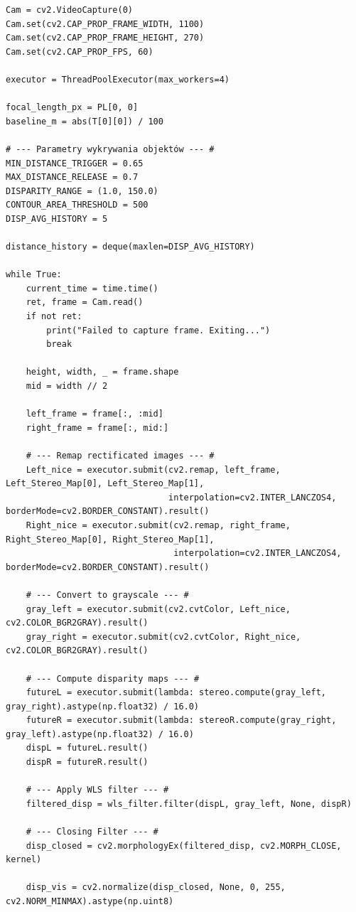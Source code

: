 \documentclass[magisterska]{pracadypl}
\begin{document}
\begin{lstlisting}[style=mypython]
Cam = cv2.VideoCapture(0)
Cam.set(cv2.CAP_PROP_FRAME_WIDTH, 1100)  
Cam.set(cv2.CAP_PROP_FRAME_HEIGHT, 270)
Cam.set(cv2.CAP_PROP_FPS, 60)

executor = ThreadPoolExecutor(max_workers=4)

focal_length_px = PL[0, 0]
baseline_m = abs(T[0][0]) / 100  

# --- Parametry wykrywania objektów --- #
MIN_DISTANCE_TRIGGER = 0.65
MAX_DISTANCE_RELEASE = 0.7
DISPARITY_RANGE = (1.0, 150.0)
CONTOUR_AREA_THRESHOLD = 500
DISP_AVG_HISTORY = 5

distance_history = deque(maxlen=DISP_AVG_HISTORY)

while True:
    current_time = time.time()
    ret, frame = Cam.read()
    if not ret:
        print("Failed to capture frame. Exiting...")
        break

    height, width, _ = frame.shape
    mid = width // 2

    left_frame = frame[:, :mid]
    right_frame = frame[:, mid:]

    # --- Remap rectificated images --- #
    Left_nice = executor.submit(cv2.remap, left_frame, Left_Stereo_Map[0], Left_Stereo_Map[1],
                                interpolation=cv2.INTER_LANCZOS4, borderMode=cv2.BORDER_CONSTANT).result()
    Right_nice = executor.submit(cv2.remap, right_frame, Right_Stereo_Map[0], Right_Stereo_Map[1],
                                 interpolation=cv2.INTER_LANCZOS4, borderMode=cv2.BORDER_CONSTANT).result()

    # --- Convert to grayscale --- #
    gray_left = executor.submit(cv2.cvtColor, Left_nice, cv2.COLOR_BGR2GRAY).result()
    gray_right = executor.submit(cv2.cvtColor, Right_nice, cv2.COLOR_BGR2GRAY).result()

    # --- Compute disparity maps --- #
    futureL = executor.submit(lambda: stereo.compute(gray_left, gray_right).astype(np.float32) / 16.0)
    futureR = executor.submit(lambda: stereoR.compute(gray_right, gray_left).astype(np.float32) / 16.0)
    dispL = futureL.result()
    dispR = futureR.result()

    # --- Apply WLS filter --- #
    filtered_disp = wls_filter.filter(dispL, gray_left, None, dispR)

    # --- Closing Filter --- #
    disp_closed = cv2.morphologyEx(filtered_disp, cv2.MORPH_CLOSE, kernel)

    disp_vis = cv2.normalize(disp_closed, None, 0, 255, cv2.NORM_MINMAX).astype(np.uint8)


\end{lstlisting}
\end{document}
